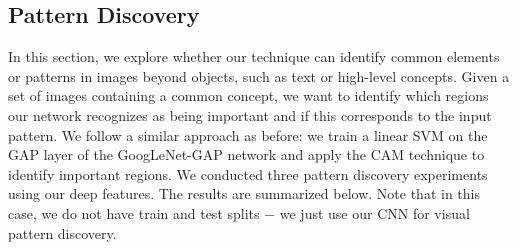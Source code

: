 \documentclass[10pt,twocolumn,letterpaper]{article}
\begin{document}
\subsection{Pattern Discovery}
\label{sec:pattern}

In this section, we explore whether our technique can identify common elements or patterns in images beyond objects, such as text or high-level concepts. Given a set of images containing a common concept, we want to identify which regions our network recognizes as being important and if this corresponds to the input pattern. We follow a similar approach as before: we train a linear SVM on the GAP layer of the GoogLeNet-GAP network and apply the CAM technique to identify important regions. We conducted three pattern discovery experiments using our deep features. The results are summarized below. Note that in this case, we do not have train and test splits $-$ we just use our CNN for visual pattern discovery.


\end{document}
